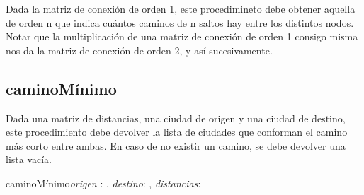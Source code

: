 \documentclass[10pt,a4paper]{article}
\begin{document}
Dada la matriz de conexión de orden 1, este procedimineto debe obtener aquella de orden n que indica cuántos caminos de n saltos hay entre los distintos nodos. Notar que la multiplicación de una matriz de conexión de orden 1 consigo misma nos da la matriz de conexión de orden 2, y así sucesivamente.

 \vspace{2mm}
 
 

\vspace{4mm}


\subsection{caminoMínimo}

 Dada una matriz de distancias, una ciudad de origen y una ciudad de destino, este procedimiento debe devolver la lista de ciudades que conforman el camino más corto entre ambas. En caso de no existir un camino, se debe devolver una lista vacía.

 \vspace{2mm}

 \begin{proc}{caminoMínimo}{\In \textit{origen} : \ent, \In \textit{destino}: \ent, \In \textit{distancias}: \TLista{\TLista{\ent}}}{\TLista{\ent}}
\end{proc}

\end{document}
